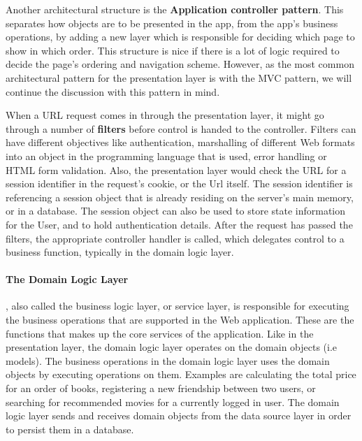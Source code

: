 Another architectural structure is the \textbf{Application controller pattern}\cite[p.379-386]{poea}. This separates how objects are to be presented in the app, from the app's business operations, by adding a new layer which is responsible for deciding which page to show in which order. This structure is nice if there is a lot of logic required to decide the page's ordering and navigation scheme. However, as the most common architectural pattern for the presentation layer is with the MVC pattern, we will continue the discussion with this pattern in mind. 

When a URL request comes in through the presentation layer, it might go through a number of \textbf{filters} before control is handed to the controller. Filters can have different objectives like authentication, marshalling of different Web formats into an object in the programming language that is used, error handling or HTML form validation. Also, the presentation layer would check the URL for a session identifier in the request's cookie, or the Url itself. The session identifier is referencing a session object that is already residing on the server's main memory, or in a database. The session object can also be used to store state information for the User, and to hold authentication details. After the request has passed the filters, the appropriate controller handler is called, which delegates control to a business function, typically in the domain logic layer. 


\paragraph{The Domain Logic Layer}, also called the business logic layer, or service layer, is responsible for executing the business operations that are supported in the Web application. These are the functions that makes up the core services of the application. Like in the presentation layer, the domain logic layer operates on the domain objects (i.e models). The business operations in the domain logic layer uses the domain objects by executing operations on them. Examples are calculating the total price for an order of books, registering a new friendship between two users, or searching for recommended movies for a currently logged in user. The domain logic layer sends and receives domain objects from the data source layer in order to persist them in a database. 

